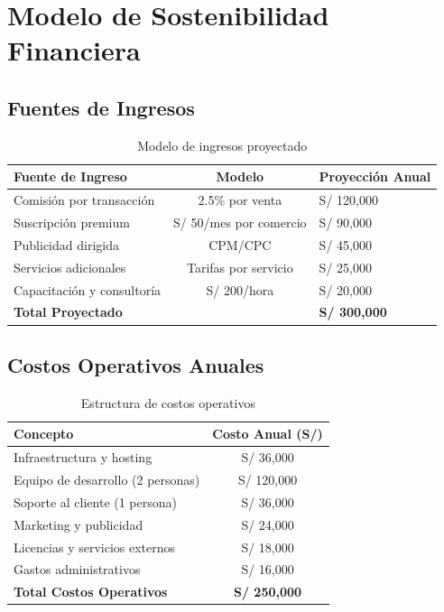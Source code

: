 \documentclass[12pt,a4paper]{report}
\begin{document}
\section{Modelo de Sostenibilidad Financiera}

\subsection{Fuentes de Ingresos}

\begin{table}[ht]
	\centering
	\begin{tabular}{lcl}
		\toprule
		\rowcolor{orange!30}
		\textbf{Fuente de Ingreso} & \textbf{Modelo}        & \textbf{Proyección Anual} \\
		\midrule
		Comisión por transacción   & 2.5\% por venta        & S/ 120,000                \\
		Suscripción premium        & S/ 50/mes por comercio & S/ 90,000                 \\
		Publicidad dirigida        & CPM/CPC                & S/ 45,000                 \\
		Servicios adicionales      & Tarifas por servicio   & S/ 25,000                 \\
		Capacitación y consultoría & S/ 200/hora            & S/ 20,000                 \\
		\midrule
		\rowcolor{orange!20}
		\textbf{Total Proyectado}  &                        & \textbf{S/ 300,000}       \\
		\bottomrule
	\end{tabular}
	\caption{Modelo de ingresos proyectado}
\end{table}


\subsection{Costos Operativos Anuales}

\begin{table}[ht]
	\centering
	\begin{tabular}{lc}
		\toprule
		\rowcolor{orange!30}
		\textbf{Concepto}                 & \textbf{Costo Anual (S/)} \\
		\midrule
		Infraestructura y hosting         & S/ 36,000                 \\
		Equipo de desarrollo (2 personas) & S/ 120,000                \\
		Soporte al cliente (1 persona)    & S/ 36,000                 \\
		Marketing y publicidad            & S/ 24,000                 \\
		Licencias y servicios externos    & S/ 18,000                 \\
		Gastos administrativos            & S/ 16,000                 \\
		\midrule
		\rowcolor{orange!20}
		\textbf{Total Costos Operativos}  & \textbf{S/ 250,000}       \\
		\bottomrule
	\end{tabular}
	\caption{Estructura de costos operativos}
\end{table}
\end{document}
